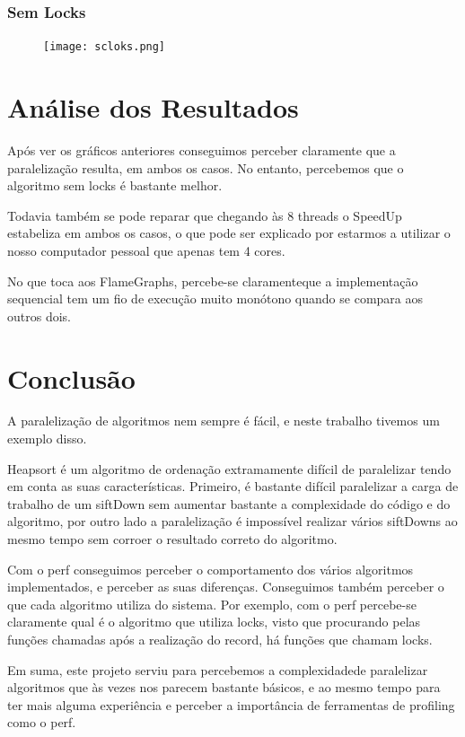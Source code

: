 \documentclass{article}
\begin{document}
\subsubsection{Sem Locks}
\begin{figure}[!htb]
  \centering
  \texttt{[image: scloks.png]}
\end{figure}

\section{Análise dos Resultados}
\par Após ver os gráficos anteriores conseguimos perceber claramente que a paralelização resulta, em ambos os casos. No entanto, percebemos que o algoritmo sem locks é bastante melhor.
\par Todavia também se pode reparar que chegando às 8 threads o SpeedUp estabeliza em ambos os casos, o que pode ser explicado por estarmos a utilizar o nosso computador pessoal que apenas tem 4 cores.
\par No que toca aos FlameGraphs, percebe-se claramenteque a implementação sequencial tem um fio de execução muito monótono quando se compara aos outros dois.

\section{Conclusão}
\par A paralelização de algoritmos nem sempre é fácil, e neste trabalho tivemos um exemplo disso. 
\par Heapsort é um algoritmo de ordenação extramamente difícil de paralelizar tendo em conta as suas características. Primeiro, é bastante difícil paralelizar a carga de trabalho de um siftDown sem aumentar bastante a complexidade do código e do algoritmo, por outro lado a paralelização é impossível realizar vários siftDowns ao mesmo tempo sem corroer o resultado correto do algoritmo.
\par Com o perf conseguimos perceber o comportamento dos vários algoritmos implementados, e perceber as suas diferenças. Conseguimos também perceber o que cada algoritmo utiliza do sistema. Por exemplo, com o perf percebe-se claramente qual é o algoritmo que utiliza locks, visto que procurando pelas funções chamadas após a realização do record, há funções que chamam locks.
\par Em suma, este projeto serviu para percebemos a complexidadede paralelizar algoritmos que às vezes nos parecem bastante básicos, e ao mesmo tempo para ter mais alguma experiência e perceber a importância de ferramentas de profiling como o perf.

\clearpage
\end{document}
